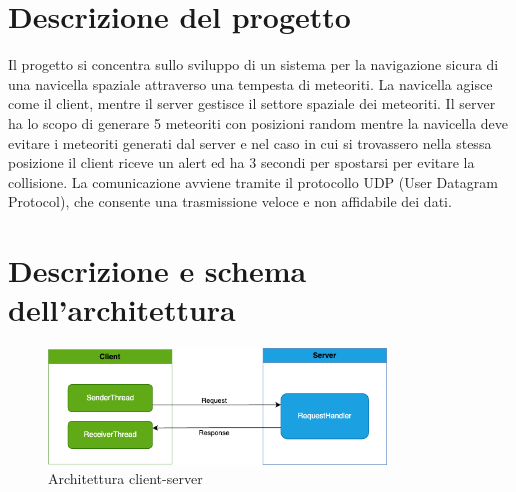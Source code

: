 \documentclass{article}
\begin{document}

\setcounter{page}{1}

\section{Descrizione del progetto}
\label{sec:Descrizione del progetto}

Il progetto si concentra sullo sviluppo di un sistema per la navigazione sicura di una navicella spaziale attraverso una tempesta di meteoriti. La navicella agisce come il client, mentre il server gestisce il settore spaziale dei meteoriti. Il server ha lo scopo di generare 5 meteoriti con posizioni random mentre la navicella deve evitare i meteoriti generati dal server e nel caso in cui si trovassero nella stessa posizione il client riceve un alert ed ha 3 secondi per spostarsi per evitare la collisione.
La comunicazione avviene tramite il protocollo UDP (User Datagram Protocol), che consente una trasmissione veloce e non affidabile dei dati.




\section{Descrizione e schema dell'architettura}
\label{sec:Descrizione e schema dell'architettura}

\begin{figure}[htbp] %
  \centering %
  \includegraphics[width=0.8\textwidth]{images/SchemaUDP.png} %
  \caption{Architettura client-server} %
  \label{fig:label} %
\end{figure}
\end{document}
